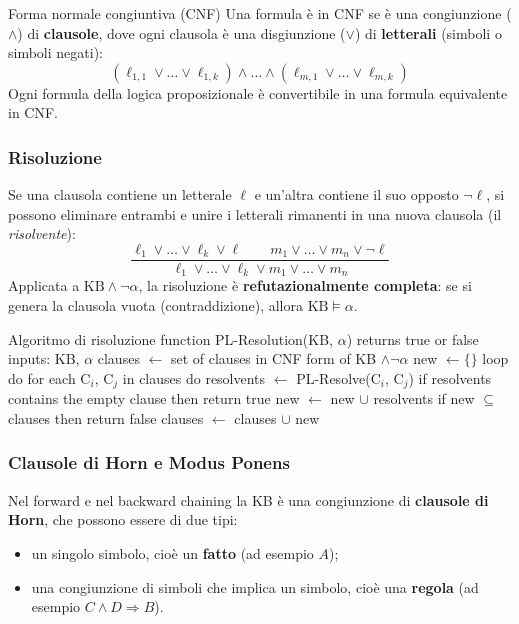 \documentclass[11pt, a4paper]{article}
\renewcommand{\emph}[1]{\textcolor{verdechiaro}{\itshape #1}}
\newcommand{\KB}{\mathrm{KB}}
\begin{document}
\begin{defbox}{Forma normale congiuntiva (CNF)}
  Una formula è in CNF se è una congiunzione ($\land$) di \textbf{clausole}, dove ogni clausola è una disgiunzione ($\lor$) di \textbf{letterali} (simboli o simboli negati):
  \[
    (\ell_{1,1} \lor \dots \lor \ell_{1,k}) \land \dots \land (\ell_{m,1} \lor \dots \lor \ell_{m,k})
  \]
  Ogni formula della logica proposizionale è convertibile in una formula equivalente in CNF.
\end{defbox}

\subsubsection*{Risoluzione}

Se una clausola contiene un letterale $\ell$ e un'altra contiene il suo opposto $\lnot\ell$, si possono eliminare entrambi e unire i letterali rimanenti in una nuova clausola (il \emph{risolvente}):
\[
  \frac{\ell_1 \lor \dots \lor \ell_k \lor \ell \qquad m_1 \lor \dots \lor m_n \lor \lnot\ell}
       {\ell_1 \lor \dots \lor \ell_k \lor m_1 \lor \dots \lor m_n}
\]
Applicata a $\KB \land \lnot\alpha$, la risoluzione è \textbf{refutazionalmente completa}: se si genera la clausola vuota (contraddizione), allora $\KB \models \alpha$.

\begin{codice}{Algoritmo di risoluzione}
function PL-Resolution(KB, $\alpha$) returns true or false
  inputs: KB, $\alpha$
  clauses $\leftarrow$ set of clauses in CNF form of KB $\wedge\lnot\alpha$
  new $\leftarrow\{\}$
  loop do
    for each C$_i$, C$_j$ in clauses do
      resolvents $\leftarrow$ PL-Resolve(C$_i$, C$_j$)
      if resolvents contains the empty clause then return true
      new $\leftarrow$ new $\cup$ resolvents
    if new $\subseteq$ clauses then return false
    clauses $\leftarrow$ clauses $\cup$ new
\end{codice}

\subsubsection*{Clausole di Horn e Modus Ponens}

Nel forward e nel backward chaining la KB è una congiunzione di \textbf{clausole di Horn}, che possono essere di due tipi:
\begin{itemize}
  \item un singolo simbolo, cioè un \textbf{fatto} (ad esempio $A$);
  \item una congiunzione di simboli che implica un simbolo, cioè una \textbf{regola} (ad esempio $C\land D\Rightarrow B$).
\end{itemize}
\end{document}
